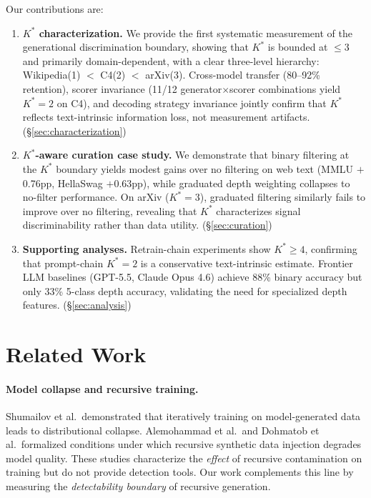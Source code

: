 \documentclass[11pt]{article}
\begin{document}
Our contributions are:
\begin{enumerate}
\item \textbf{$K^*$ characterization.} We provide the first systematic measurement of the generational discrimination boundary, showing that $K^*$ is bounded at $\leq 3$ and primarily domain-dependent, with a clear three-level hierarchy: Wikipedia(1) $<$ C4(2) $<$ arXiv(3). Cross-model transfer (80--92\% retention), scorer invariance (11/12 generator$\times$scorer combinations yield $K^*{=}2$ on C4), and decoding strategy invariance jointly confirm that $K^*$ reflects text-intrinsic information loss, not measurement artifacts. (\S\ref{sec:characterization})
\item \textbf{$K^*$-aware curation case study.} We demonstrate that binary filtering at the $K^*$ boundary yields modest gains over no filtering on web text (MMLU $+$0.76pp, HellaSwag $+$0.63pp), while graduated depth weighting collapses to no-filter performance. On arXiv ($K^*{=}3$), graduated filtering similarly fails to improve over no filtering, revealing that $K^*$ characterizes signal discriminability rather than data utility. (\S\ref{sec:curation})
\item \textbf{Supporting analyses.} Retrain-chain experiments show $K^*{\geq}4$, confirming that prompt-chain $K^*{=}2$ is a conservative text-intrinsic estimate. Frontier LLM baselines (GPT-5.5, Claude Opus 4.6) achieve 88\% binary accuracy but only 33\% 5-class depth accuracy, validating the need for specialized depth features. (\S\ref{sec:analysis})
\end{enumerate}

\section{Related Work}

\paragraph{Model collapse and recursive training.}
Shumailov et al.\ demonstrated that iteratively training on model-generated data leads to distributional collapse. Alemohammad et al.\ and Dohmatob et al.\ formalized conditions under which recursive synthetic data injection degrades model quality. These studies characterize the \emph{effect} of recursive contamination on training but do not provide detection tools. Our work complements this line by measuring the \emph{detectability boundary} of recursive generation.
\end{document}
